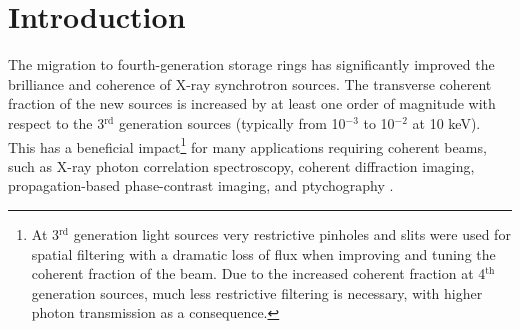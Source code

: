 \documentclass[preprint]{iucr}
\newcommand{\inred}[1]{{\color{red}#1}}
\begin{document}
\section{Introduction}
\label{sec:introduction}

The migration to fourth-generation storage rings has significantly improved \inred{the} brilliance and coherence of X-ray synchrotron sources. The transverse coherent fraction of the new sources is increased by at least one order of magnitude with respect \inred{to} the 3$^{\text{rd}}$ generation sources (typically from 10$^{-3}$ to 10$^{-2}$ at 10 keV). This has a beneficial impact\footnote{At 3$^{\text{rd}}$ generation light sources very restrictive pinholes and slits were used for spatial filtering with a dramatic loss of flux when improving and tuning the coherent fraction of the beam. Due to the increased coherent fraction at 4$^{\text{th}}$ generation sources, much less restrictive filtering is necessary, with higher photon transmission as a consequence.} for many applications requiring coherent beams, such as X-ray photon correlation spectroscopy, coherent diffraction imaging, propagation-based phase-contrast imaging, and ptychography \cite{paganin_book}.
\end{document}
